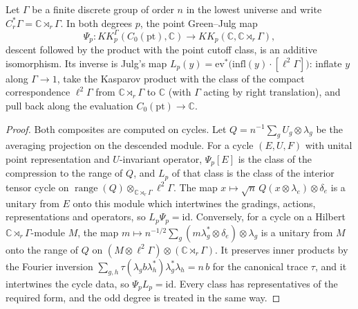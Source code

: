 \begin{proposition}\label{prop:finite-point-green-julg}
\leanok
Let $\Gamma$ be a finite discrete group of order $n$ in the lowest universe and
write $C^*_r\Gamma=\mathbb C\rtimes_r\Gamma$. In both degrees $p$, the point
Green--Julg map
\[
  \Psi_p\colon KK^\Gamma_p(C_0(\mathrm{pt}),\mathbb C)\to KK_p(\mathbb C,\mathbb C\rtimes_r\Gamma),
\]
descent followed by the product with the point cutoff class, is an additive
isomorphism. Its inverse is Julg's map
$L_p(y)=\mathrm{ev}^*\bigl(\mathrm{infl}(y)\cdot[\ell^2\Gamma]\bigr)$:
inflate $y$ along $\Gamma\to 1$, take the Kasparov product with the class of
the compact correspondence $\ell^2\Gamma$ from $\mathbb C\rtimes_r\Gamma$ to
$\mathbb C$ (with $\Gamma$ acting by right translation), and pull back along
the evaluation $C_0(\mathrm{pt})\to\mathbb C$.
\end{proposition}
\begin{proof}
\leanok
Both composites are computed on cycles. Let $Q=n^{-1}\sum_g U_g\otimes\lambda_g$
be the averaging projection on the descended module. For a cycle $(E,U,F)$
with unital point representation and $U$-invariant operator, $\Psi_p[E]$ is
the class of the compression to the range of $Q$, and $L_p$ of that class is
the class of the interior tensor cycle on
$\operatorname{range}(Q)\otimes_{\mathbb C\rtimes_r\Gamma}\ell^2\Gamma$. The map
$x\mapsto\sqrt n\,Q(x\otimes\lambda_e)\otimes\delta_e$ is a unitary from $E$
onto this module which intertwines the gradings, actions, representations and
operators, so $L_p\Psi_p=\mathrm{id}$. Conversely, for a cycle on a Hilbert
$\mathbb C\rtimes_r\Gamma$-module $M$, the map
$m\mapsto n^{-1/2}\sum_g (m\lambda_g^*\otimes\delta_e)\otimes\lambda_g$ is a
unitary from $M$ onto the range of $Q$ on
$(M\otimes\ell^2\Gamma)\otimes(\mathbb C\rtimes_r\Gamma)$. It preserves inner
products by the Fourier inversion
$\sum_{g,h}\tau(\lambda_g b\lambda_h^*)\lambda_g^*\lambda_h=n\,b$ for the
canonical trace $\tau$, and it intertwines the cycle data, so
$\Psi_pL_p=\mathrm{id}$. Every class has representatives of the required
form, and the odd degree is treated in the same way.
\end{proof}

